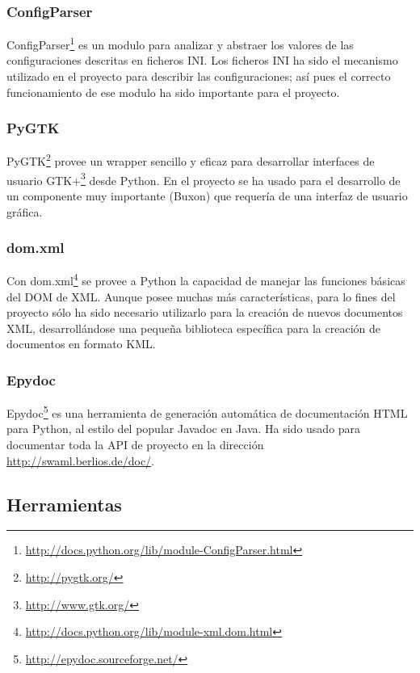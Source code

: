 \subsubsection{ConfigParser}

ConfigParser\footnote{\url{http://docs.python.org/lib/module-ConfigParser.html}}
es un modulo para analizar y abstraer los valores de las configuraciones descritas
en ficheros INI. Los ficheros INI ha sido el mecanismo utilizado en el proyecto
para describir las configuraciones; así pues el correcto funcionamiento de ese 
modulo ha sido importante para el proyecto.

\subsubsection{PyGTK}

PyGTK\footnote{\url{http://pygtk.org/}} provee un wrapper sencillo y eficaz 
para desarrollar interfaces de usuario GTK+\footnote{\url{http://www.gtk.org/}} 
desde Python. En el proyecto se ha usado para el desarrollo de un componente 
muy importante (Buxon) que requería de una interfaz de usuario gráfica.

\subsubsection{dom.xml}

Con dom.xml\footnote{\url{http://docs.python.org/lib/module-xml.dom.html}} se
provee a Python la capacidad de manejar las funciones básicas del DOM de XML.
Aunque posee muchas más características, para lo fines del proyecto sólo
ha sido necesario utilizarlo para la creación de nuevos documentos XML,
desarrollándose una pequeña biblioteca específica para la creación de 
documentos en formato KML.

\subsubsection{Epydoc}

Epydoc\footnote{\url{http://epydoc.sourceforge.net/}} es una herramienta de
generación automática de documentación HTML para Python, al estilo del popular
Javadoc en Java. Ha sido usado para documentar toda la API de proyecto en
la dirección \url{http://swaml.berlios.de/doc/}.

\subsection{Herramientas}

